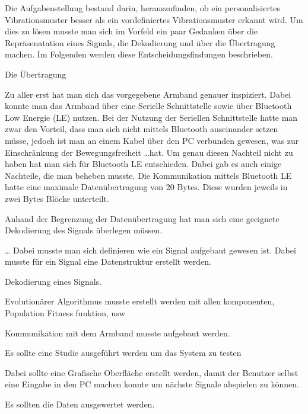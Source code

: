 
Die Aufgabenstellung bestand darin, herauszufinden, ob ein personalisiertes Vibrationsmuster besser als ein vordefiniertes Vibrationsmuster erkannt wird.
Um dies zu lösen musste man sich im Vorfeld ein paar Gedanken über die Repräsenatation eines Signals, die Dekodierung und über die Übertragung machen.
Im Folgenden werden diese Entscheidungsfindungen beschrieben.

Die Übertragung

Zu aller erst hat man sich das vorgegebene Armband genauer inspiziert. Dabei konnte man das Armband über eine Serielle Schnittstelle sowie über Bluetooth Low Energie (LE) nutzen. 
Bei der Nutzung der Seriellen Schnittstelle hatte man zwar den Vorteil, dass man sich nicht mittels Bluetooth auseinander setzen müsse, jedoch ist man an einem Kabel über den PC verbunden gewesen, was zur Einschränkung der Bewegungsfreiheit \dots hat. Um genau diesen Nachteil nicht zu haben hat man sich für Bluetooth LE entschieden. Dabei gab es auch einige Nachteile, die man beheben musste. Die Kommunikation mittels Bluetooth LE hatte eine maximale Datenübertragung von 20 Bytes. Diese wurden jeweils in zwei Bytes Blöcke unterteilt.

Anhand der Begrenzung der Datenübertragung hat man sich eine geeignete Dekodierung des Signals überlegen müssen. 











\dots
Dabei musste man sich definieren wie ein Signal aufgebaut gewesen ist. Dabei musste für ein Signal eine Datenstruktur erstellt werden. 



Dekodierung eines Signals.

Evolutionärer Algorithmus musste erstellt werden mit allen komponenten, Population Fitness funktion, usw

Kommunikation mit dem Armband musste aufgebaut werden. 

Es sollte eine Studie ausgeführt werden um das System zu testen 

Dabei sollte eine Grafische Oberfläche erstellt werden, damit der Benutzer selbst eine Eingabe in den PC machen konnte um nächste Signale abspielen zu können.

Es sollten die Daten ausgewertet werden.
